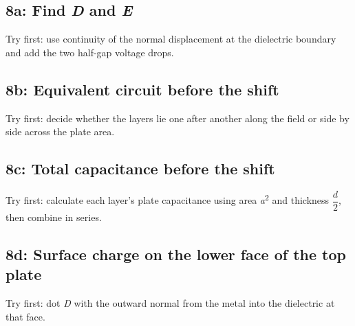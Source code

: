 \documentclass[11pt]{article}
\begin{document}
\begin{keepsection}
\begin{keepsection}
\subsection{8a: Find \textit{D} and \textit{E}}

Try first: use continuity of the normal displacement at the dielectric boundary and add the two half-gap voltage drops.

\end{keepsection}

\begin{keepsection}
\subsection{8b: Equivalent circuit before the shift}

Try first: decide whether the layers lie one after another along the field or side by side across the plate area.

\end{keepsection}

\begin{keepsection}
\subsection{8c: Total capacitance before the shift}

Try first: calculate each layer’s plate capacitance using area \textit{a}\textsuperscript{2} and thickness {\small\ensuremath{\dfrac{{d}}{2}}}, then combine in series.

\end{keepsection}

\begin{keepsection}
\subsection{8d: Surface charge on the lower face of the top plate}

Try first: dot \textit{D} with the outward normal from the metal into the dielectric at that face.


\end{keepsection}
\end{keepsection}
\end{document}
